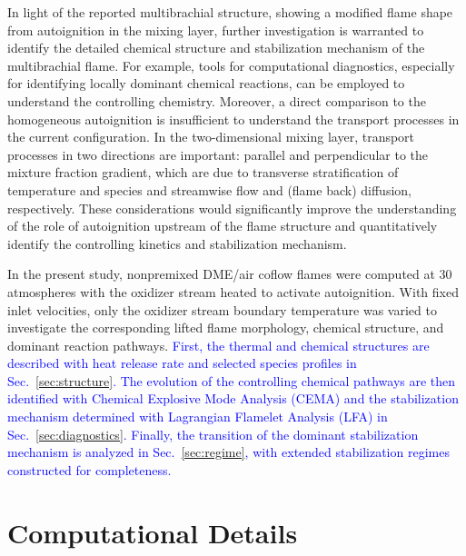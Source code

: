 \documentclass[review,3p,times]{elsarticle}
\begin{document}
In light of the reported multibrachial structure, showing a modified flame shape from autoignition in the mixing layer, further investigation is warranted to identify the detailed chemical structure and stabilization mechanism of the multibrachial flame.  For example, tools for computational diagnostics, especially for identifying locally dominant chemical reactions, can be employed to understand the controlling chemistry.  Moreover, a direct comparison to the homogeneous autoignition is insufficient to understand the transport processes in the current configuration.  In the two-dimensional mixing layer, transport processes in two directions are important: parallel and perpendicular to the mixture fraction gradient, which are due to transverse stratification of temperature and species and streamwise flow and (flame back) diffusion, respectively.  These considerations would significantly improve the understanding of the role of autoignition upstream of the flame structure and quantitatively identify the controlling kinetics and stabilization mechanism.     

In the present study, nonpremixed DME/air coflow flames were computed at $30$ atmospheres with the oxidizer stream heated to activate autoignition.  With fixed inlet velocities, only the oxidizer stream boundary temperature was varied to investigate the corresponding lifted flame morphology, chemical structure, and dominant reaction pathways.  \textcolor{blue}{First, the thermal and chemical structures are described with heat release rate and selected species profiles in Sec.~\ref{sec:structure}.  The evolution of the controlling chemical pathways are then identified with Chemical Explosive Mode Analysis (CEMA) and the stabilization mechanism determined with Lagrangian Flamelet Analysis (LFA) in Sec.~\ref{sec:diagnostics}.  Finally, the transition of the dominant stabilization mechanism is analyzed in Sec.~\ref{sec:regime}, with extended stabilization regimes constructed for completeness.}

 

\section{Computational Details} \label{sec:computation}
\end{document}
